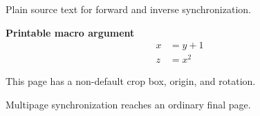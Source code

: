 \documentclass{article}
\begin{document}
Plain source text for forward and inverse synchronization.

\newpage
{}
\textbf{Printable macro argument}
\[
\begin{aligned}
  x &= y + 1 \\
  z &= x^2
\end{aligned}
\]

\newpage
{}
This page has a non-default crop box, origin, and rotation.

\newpage
\pdfpageattr{}
Multipage synchronization reaches an ordinary final page.
\end{document}
